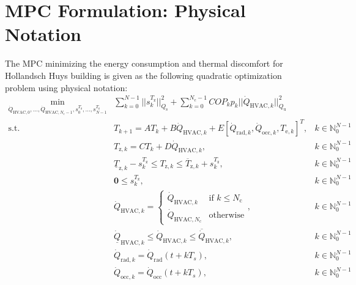 \documentclass[10pt]{extarticle}
\begin{document}
\section{MPC Formulation: Physical Notation}\label{sec:physical_notation}




The MPC minimizing  the energy consumption and  thermal discomfort 
for Hollandsch Huys building is given as the following quadratic optimization problem using physical notation:
\begin{subequations}
\label{eq:mpc_general}
\begin{align}
 \min_{\dot{Q}_{\text{HVAC},0}, \ldots, \dot{Q}_{\text{HVAC},{N_{\text{c}}-1}},
 s^{T_{\text{z}}}_0, \ldots, s^{T_{\text{z}}}_{N-1}} & \sum_{k=0}^{N-1}  
 || s^{T_{\text{z}}}_k ||_{Q_\text{s}}^2 +  \sum_{k=0}^{N_{\text{c}}-1} COP_k p_k ||\dot{Q}_{\text{HVAC},k} ||_{Q_\text{u}}^2  &
 \label{eq:mpc_general:cost}\\
  \text{s.t.} \ & T_{k+1} = A T_k+ B \dot{Q}_{\text{HVAC},k} +E [\dot{Q}_{\text{rad},k}, \dot{Q}_{\text{occ},k}, T_{\text{e},k}]^T, & k \in \mathbb{N}_{0}^{N-1} \label{eq:mpc_general:x} \\
  & T_{\text{z},k} = C T_k + D \dot{Q}_{\text{HVAC},k}, & k \in \mathbb{N}_{0}^{N-1} \label{eq:mpc_general:y} \\
  & \underline{T}_{\text{z},k} - s^{T_{\text{z}}}_k \le T_{\text{z},k} \le \overline{T}_{\text{z},k} + s^{T_{\text{z}}}_k, & k \in \mathbb{N}_{0}^{N-1} \label{eq:mpc_general:zone} \\
   & \mathbf{0} \le s^{T_{\text{z}}}_k  ,  & k \in \mathbb{N}_{0}^{N-1} \label{eq:mpc_general:lb_sk}\\
    & \dot{Q}_{\text{HVAC},k} =  \begin{cases}
    \dot{Q}_{\text{HVAC},k} & \text{if } k \leq N_{\text{c}}\\
   \dot{Q}_{\text{HVAC},N_{\text{c}}}     & \text{otherwise}   \end{cases}, & k \in \mathbb{N}_{0}^{N-1} \label{eq:mpc_general:move_block} \\
  &  \underline{\dot{Q}}_{\text{HVAC},k} \le \dot{Q}_{\text{HVAC},k} \le \overline{\dot{Q}}_{\text{HVAC},k},  & k \in \mathbb{N}_{0}^{N-1} \label{eq:mpc_general:ub}\\
   & \dot{Q}_{\text{rad},k} =  \dot{Q}_{\text{rad}}(t+ k T_s), & k \in \mathbb{N}_{0}^{N-1} \label{eq:mpc_general:d0} \\
   & \dot{Q}_{\text{occ},k} = \dot{Q}_{\text{occ}}(t+ k T_s), & k \in \mathbb{N}_{0}^{N-1} \label{eq:mpc_general:d0} \\

\end{align}
\end{subequations}
\end{document}
